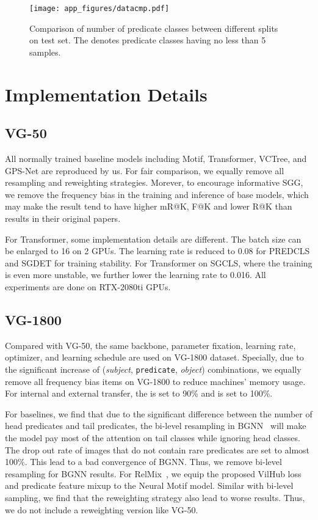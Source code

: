 \documentclass[runningheads]{llncs}
\begin{document}
\begin{figure}[t]
    \centering
    \texttt{[image: app\_figures/datacmp.pdf]}
    \caption{Comparison of number of predicate classes between different splits on test set. The  denotes predicate classes having no less than 5 samples.}
    \label{fig:data_cmp}
\end{figure}

\section{Implementation Details}
\subsection{VG-50}
All normally trained baseline models including Motif, Transformer, VCTree, and GPS-Net are reproduced by us.
For fair comparison, we equally remove all resampling and reweighting strategies.
Morever, to encourage informative SGG, we remove the frequency bias in the training and inference of base models, which may make the result tend to have higher mR@K, F@K and lower R@K than results in their original papers.

For Transformer, some implementation details are different. 
The batch size can be enlarged to 16 on 2 GPUs.
The learning rate is reduced to 0.08 for PREDCLS and SGDET for training stability.
For Transformer on SGCLS, where the training is even more unstable, we further lower the learning rate to 0.016.
All experiments are done on RTX-2080ti GPUs. 

\subsection{VG-1800}
Compared with VG-50, the same backbone, parameter fixation, learning rate, optimizer, and learning schedule are used on VG-1800 dataset.
Specially, due to the significant increase of (\textit{subject}, \texttt{predicate}, \textit{object}) combinations, we equally remove all frequency bias items on VG-1800 to reduce machines' memory usage.
For internal and external transfer, the  is set to 90\% and  is set to 100\%.

For baselines, we find that due to the significant difference between the number of head predicates and tail predicates, the bi-level resampling in BGNN~\cite{li2021bipartite} will make the model pay most of the attention on tail classes while ignoring head classes.
The drop out rate of images that do not contain rare predicates are set to almost 100\%.
This lead to a bad convergence of BGNN.
Thus, we remove bi-level resampling for BGNN results.
For RelMix~\cite{abdelkarim2020long}, we equip the proposed VilHub loss and predicate feature mixup to the Neural Motif model.
Similar with bi-level sampling, we find that the reweighting strategy also lead to worse results.
Thus, we do not include a reweighting version like VG-50.
\end{document}
